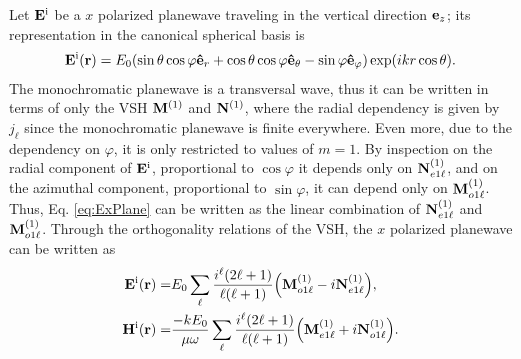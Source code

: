 
 Let $\vb{E}^{\text{i}}$ be a $x$ polarized planewave traveling in the vertical direction $\vb{e}_z$; its representation in the canonical spherical basis is
 \begin{align}
 \vb{E}^{\text{i}} (\vb{r})= E_0\qty(\sin\theta\cos\varphi \vu{e}_r +
					\cos\theta\cos\varphi \vu{e}_\theta
					- \sin\varphi \vu{e}_\varphi) \exp(ikr\cos\theta).
	\label{eq:ExPlane}
 \end{align}
The monochromatic planewave is a transversal wave, thus it can be written in terms of only the VSH $\vb{M}^{(1)}$ and $\vb{N}^{(1)}$, where the radial dependency is given by $j_\ell$ since the monochromatic planewave is finite everywhere. Even more, due to the dependency on $\varphi$, it is only restricted to values of $m = 1$. By inspection on the radial component of $\vb{E}^\text{i}$, proportional to $\cos\varphi$ it depends only on $\vb{N}_{e1\ell}^{(1)}$, and on the azimuthal component, proportional to $\sin\varphi$, it can depend only on $\vb{M}_{o1\ell}^{(1)}$. Thus, Eq. \eqref{eq:ExPlane} can be written as the linear combination of  $\vb{N}_{e1\ell}^{(1)}$ and $\vb{M}_{o1\ell}^{(1)}$. Through the orthogonality relations of the VSH, the $x$ polarized planewave can be written as \cite{stratton_electromagnetic_2012}
  \begin{subequations}
 \begin{align}
 \vb{E}^\text{i} (\vb{r})=& E_0 \sum_\ell\frac{i^\ell(2\ell+1)}{\ell(\ell+1)}\qty( \vb{M}_{o1\ell}^{(1)} -i \vb{N}_{e1\ell}^{(1)}),
\\
 \vb{H}^\text{i} (\vb{r})=& \frac{-kE_0}{\mu\omega} \sum_\ell\frac{i^\ell(2\ell+1)}{\ell(\ell+1)}\qty( \vb{M}_{e1\ell}^{(1)} +i \vb{N}_{o1\ell}^{(1)}).
 \end{align}%
 \label{eq:PlaneWaveMultipole}%
   \end{subequations}%
%

